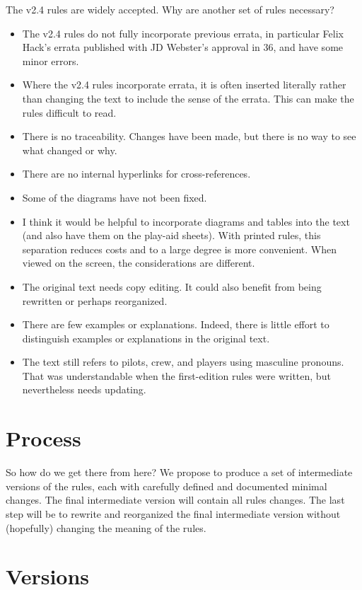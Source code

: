\documentclass{report}
\begin{document}
The v2.4 rules are widely accepted. Why are another set of rules necessary?
\begin{itemize}
    \item The v2.4 rules do not fully incorporate previous errata, in particular Felix Hack’s errata published with JD Webster's approval in {\APJ} 36, and have some minor errors.
    \item Where the v2.4 rules incorporate errata, it is often inserted literally rather than changing the text to include the sense of the errata. This can make the rules difficult to read.
    \item There is no traceability. Changes have been made, but there is no way to see what changed or why.
    \item There are no internal hyperlinks for cross-references.
    \item Some of the diagrams have not been fixed.
    \item I think it would be helpful to incorporate diagrams and tables into the text (and also have them on the play-aid sheets). With printed rules, this separation reduces costs and to a large degree is more convenient. When viewed on the screen, the considerations are different.
    \item The original text needs copy editing. It could also benefit from being rewritten or perhaps reorganized.
    \item There are few examples or explanations. Indeed, there is little effort to distinguish examples or explanations in the original text.
    \item The text still refers to pilots, crew, and players using masculine pronouns. That was understandable when the first-edition rules were written, but nevertheless needs updating.
\end{itemize}

\section{Process}

So how do we get there from here? We propose to produce a set of intermediate versions of the rules, each with carefully defined and documented minimal changes. The final intermediate version will contain all rules changes. The last step will be to rewrite and reorganized the final intermediate version without (hopefully) changing the meaning of the rules.

\section{Versions}
\end{document}
